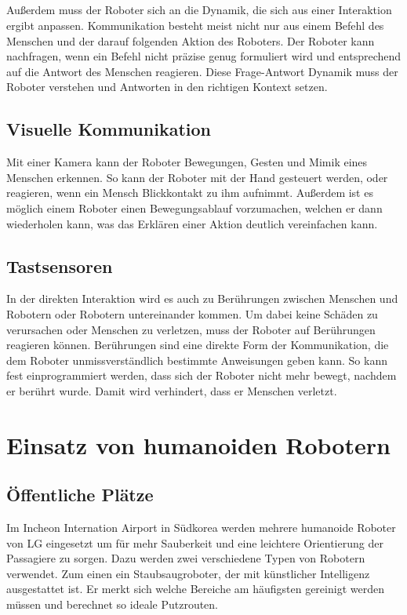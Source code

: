 \subparagraph{}
Außerdem muss der Roboter sich an die Dynamik, die sich aus einer Interaktion
ergibt anpassen. Kommunikation besteht meist nicht nur aus einem Befehl des
Menschen und der darauf folgenden Aktion des Roboters. Der Roboter kann
nachfragen, wenn ein Befehl nicht präzise genug formuliert wird und entsprechend
auf die Antwort des Menschen reagieren. Diese Frage-Antwort Dynamik muss der
Roboter verstehen und Antworten in den richtigen Kontext setzen.

\subsection{Visuelle Kommunikation}
Mit einer Kamera kann der Roboter Bewegungen, Gesten und Mimik eines Menschen
erkennen. So kann der Roboter mit der Hand gesteuert werden, oder reagieren,
wenn ein Mensch Blickkontakt zu ihm aufnimmt. Außerdem ist es möglich
einem Roboter einen Bewegungsablauf vorzumachen, welchen er dann wiederholen
kann, was das Erklären einer Aktion deutlich vereinfachen kann.

\subsection{Tastsensoren}
In der direkten Interaktion wird es auch zu
Berührungen zwischen Menschen und Robotern oder Robotern untereinander kommen.
Um dabei keine Schäden zu verursachen oder Menschen zu verletzen, muss der
Roboter auf Berührungen reagieren können. Berührungen sind eine direkte Form der
Kommunikation, die dem Roboter unmissverständlich bestimmte Anweisungen geben
kann. So kann fest einprogrammiert werden, dass sich der Roboter nicht mehr
bewegt, nachdem er berührt wurde. Damit wird verhindert, dass er Menschen
verletzt. \cite{Prassler2004}

\section{Einsatz von humanoiden Robotern}\label{sec:einsatz}
\subsection{Öffentliche Plätze}\label{sec:oeffentliche-plaetze}
Im Incheon Internation Airport in Südkorea werden mehrere humanoide Roboter von
LG eingesetzt um für mehr Sauberkeit und eine leichtere Orientierung der
Passagiere zu sorgen. Dazu werden zwei verschiedene Typen von Robotern
verwendet. Zum einen ein Staubsaugroboter, der mit künstlicher Intelligenz
ausgestattet ist. Er merkt sich welche Bereiche am häufigsten gereinigt werden
müssen und berechnet so ideale Putzrouten.

